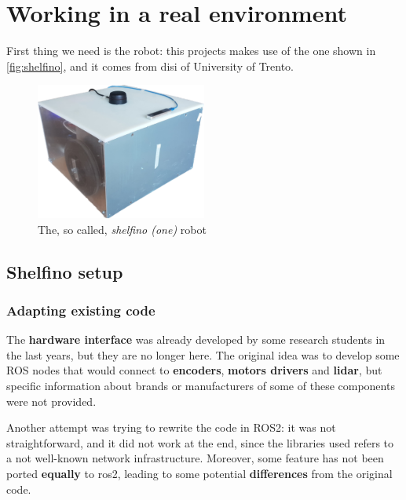 
\chapter{Working in a real environment}
\label{cha:realworld}

First thing we need is the robot: this projects makes use of the one shown in \autoref{fig:shelfino}, and it comes from \acrfull{disi} of University of Trento.

\bigskip

\begin{figure}[h]
  \centering
  \includegraphics[width=0.5\textwidth]{images/shelfino}
  \caption{The, so called, \textit{shelfino (one)} robot}
  \label{fig:shelfino}
\end{figure}

\section{Shelfino setup} 

\subsection{Adapting existing code}

The \textbf{hardware interface} was already developed by some research students in the last years, but they are no longer here. The original idea was to develop some ROS nodes that would connect to \textbf{encoders}, \textbf{motors drivers} and \textbf{lidar}, but specific information about brands or manufacturers of some of these components were not provided.

Another attempt was trying to rewrite the code in ROS2: it was not straightforward, and it did not work at the end, since the libraries used refers to a not well-known network infrastructure. Moreover, some feature has not been ported \textbf{equally} to \acrshort{ros}2, leading to some potential \textbf{differences} from the original code.

